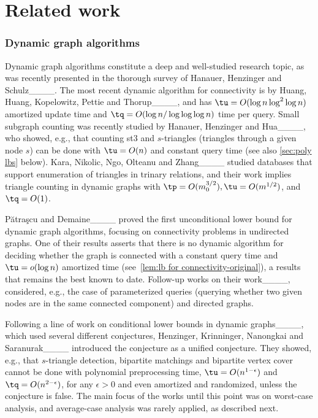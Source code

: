 \section{Related work}
\subsubsection{Dynamic graph algorithms}

Dynamic graph algorithms constitute a deep and well-studied research topic, 
as was recently presented in the thorough survey of Hanauer, Henzinger and Schulz____.
The most recent dynamic algorithm for connectivity is by
Huang, Huang, Kopelowitz, Pettie and Thorup____, and has $\tu=O(\log n \log^2\log n)$ amortized update time and $\tq=O(\log n/\log\log\log n)$ time per query.
Small subgraph counting was recently studied by Hanauer, Henzinger and Hua____, 
who showed, e.g., that counting \paths st3 and $s$-triangles (triangles through a given node $s$) can be done with $\tu=O(n)$ and constant query time 
(see also \cref{sec:poly lbs} below).
Kara, Nikolic, Ngo, Olteanu and Zhang____ studied databases that support enumeration of triangles in trinary relations,
and their work implies triangle counting in dynamic graphs with $\tp=O(m_0^{3/2}), \tu=O(m^{1/2})$, and~$\tq=O(1)$.

P\u{a}tra\c{s}cu and Demaine____ 
proved the first unconditional lower bound for dynamic graph algorithms, focusing on connectivity problems in undirected graphs.
One of their results asserts that there is no dynamic algorithm for deciding whether the graph is connected with a constant query time
and $\tu=o(\log n)$	amortized time
(see~\cref{lem:lb for connectivity-original}),
a results that remains the best known to date.
Follow-up works on their work____,
considered, e.g., the case of parameterized queries (querying whether two given nodes are in the same connected component) and directed graphs.


Following a line of work on conditional lower bounds in dynamic graphs____, which used several different conjectures,
Henzinger, Krinninger, Nanongkai and Saranurak____ introduced the \omv conjecture as a unified conjecture.
They showed, e.g., that 
$s$-triangle detection,
bipartite matchings
and
bipartite vertex cover cannot be done with
polynomial preprocessing time, 
	$\tu=O(n^{1-\epsilon})$
and
$\tq=O(n^{2-\epsilon})$,
for any $\epsilon>0$ and even amortized and randomized,
unless the \omv conjecture is false.	
The main focus of the works until this point was on worst-case analysis,
and average-case analysis was rarely applied, as described next.


